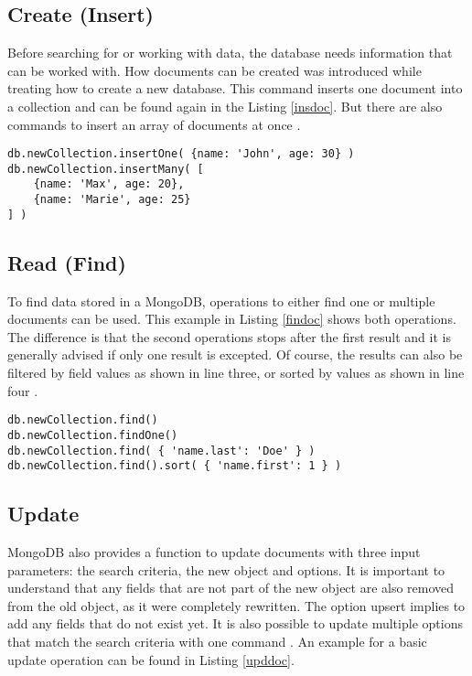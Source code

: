 \subsection{Create (Insert)}
Before searching for or working with data, the database needs information that can be worked with. How documents can be created was introduced while treating how to create a new database. This command inserts one document into a collection and can be found again in the Listing \ref{insdoc}. But there are also commands to insert an array of documents at once \cite{mdbbasics}.

\begin{lstlisting}[frame=single, caption=Create (Insert), label=insdoc]
db.newCollection.insertOne( {name: 'John', age: 30} )
db.newCollection.insertMany( [ 
    {name: 'Max', age: 20},
    {name: 'Marie', age: 25} 
] )
\end{lstlisting}

\subsection{Read (Find)}
To find data stored in a MongoDB, operations to either find one or multiple documents can be used. This example in Listing \ref{findoc} shows both operations. The difference is that the second operations stops after the first result and it is generally advised if only one result is excepted. Of course, the results can also be filtered by field values as shown in line three, or sorted by values as shown in line four \cite{mdbbasics}.

\begin{lstlisting}[frame=single, caption=Read (Find), label=findoc]
db.newCollection.find()
db.newCollection.findOne()
db.newCollection.find( { 'name.last': 'Doe' } )
db.newCollection.find().sort( { 'name.first': 1 } )
\end{lstlisting}

\subsection{Update}
MongoDB also provides a function to update documents with three input parameters: the search criteria, the new object and options. It is important to understand that any fields that are not part of the new object are also removed from the old object, as it were completely rewritten. The option upsert implies to add any fields that do not exist yet. It is also possible to update multiple options that match the search criteria with one command \cite{mdbinaction}. An example for a basic update operation can be found in Listing \ref{upddoc}.

